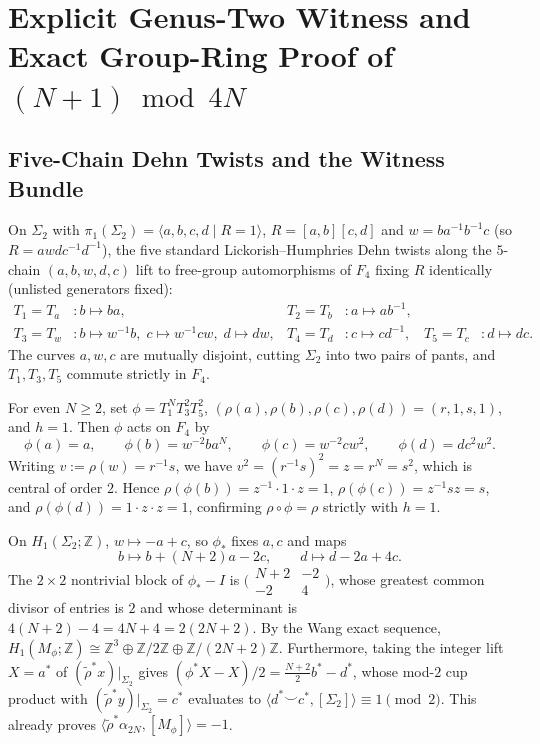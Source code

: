 \documentclass[11pt]{amsart}
\theoremstyle{definition}
\theoremstyle{remark}
\newcommand{\Z}{\mathbb{Z}}
\begin{document}
\section{Explicit Genus-Two Witness and Exact Group-Ring Proof of $(N+1) \bmod 4N$}

\subsection{Five-Chain Dehn Twists and the Witness Bundle}
On $\Sigma_2$ with $\pi_1(\Sigma_2)=\langle a,b,c,d \mid R=1\rangle$, $R=[a,b][c,d]$ and $w=ba^{-1}b^{-1}c$ (so $R = awdc^{-1}d^{-1}$), the five standard Lickorish--Humphries Dehn twists along the $5$-chain $(a,b,w,d,c)$ lift to free-group automorphisms of $F_4$ fixing $R$ identically (unlisted generators fixed):
\begin{align*}
    T_1=T_a&: b\mapsto ba, & T_2=T_b&: a\mapsto ab^{-1}, \\
    T_3=T_w&: b\mapsto w^{-1}b,\; c\mapsto w^{-1}cw,\; d\mapsto dw, & T_4=T_d&: c\mapsto cd^{-1}, & T_5=T_c&: d\mapsto dc.
\end{align*}
The curves $a,w,c$ are mutually disjoint, cutting $\Sigma_2$ into two pairs of pants, and $T_1,T_3,T_5$ commute strictly in $F_4$.

For even $N \ge 2$, set $\phi = T_1^N T_3^2 T_5^2$, $(\rho(a),\rho(b),\rho(c),\rho(d)) = (r,1,s,1)$, and $h=1$.
Then $\phi$ acts on $F_4$ by
\[
    \phi(a)=a,\qquad \phi(b)=w^{-2}ba^N,\qquad \phi(c)=w^{-2}cw^2,\qquad \phi(d)=dc^2w^2.
\]
Writing $v := \rho(w) = r^{-1}s$, we have $v^2 = (r^{-1}s)^2 = z = r^N = s^2$, which is central of order $2$.
Hence $\rho(\phi(b)) = z^{-1}\cdot 1\cdot z = 1$, $\rho(\phi(c)) = z^{-1}sz = s$, and $\rho(\phi(d)) = 1\cdot z\cdot z = 1$, confirming $\rho\circ\phi = \rho$ strictly with $h=1$.

On $H_1(\Sigma_2;\Z)$, $w \mapsto -a+c$, so $\phi_*$ fixes $a,c$ and maps
\[
    b \longmapsto b + (N+2)a - 2c, \qquad d \longmapsto d - 2a + 4c.
\]
The $2\times 2$ nontrivial block of $\phi_* - I$ is $\bigl(\begin{smallmatrix} N+2 & -2 \\ -2 & 4 \end{smallmatrix}\bigr)$, whose greatest common divisor of entries is $2$ and whose determinant is $4(N+2)-4 = 4N+4 = 2(2N+2)$.
By the Wang exact sequence, $H_1(M_\phi;\Z) \cong \Z^3 \oplus \Z/2\Z \oplus \Z/(2N+2)\Z$.
Furthermore, taking the integer lift $X = a^*$ of $(\tilde{\rho}^*x)|_{\Sigma_2}$ gives $(\phi^*X - X)/2 = \frac{N+2}{2}b^* - d^*$, whose mod-$2$ cup product with $(\tilde{\rho}^*y)|_{\Sigma_2} = c^*$ evaluates to $\langle d^*\smile c^*, [\Sigma_2]\rangle \equiv 1 \pmod 2$. This already proves $\langle \tilde{\rho}^*\alpha_{2N}, [M_\phi]\rangle = -1$.
\end{document}
